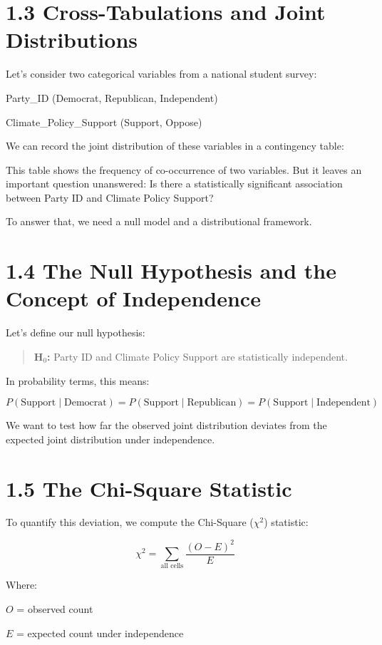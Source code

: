 \documentclass[12pt]{article}
\begin{document}
\section*{1.3 Cross-Tabulations and Joint Distributions}

Let’s consider two categorical variables from a national student survey:

Party\_ID (Democrat, Republican, Independent)

Climate\_Policy\_Support (Support, Oppose)

We can record the joint distribution of these variables in a contingency table:

This table shows the frequency of co-occurrence of two variables. But it leaves an important question unanswered: Is there a statistically significant association between Party ID and Climate Policy Support?

To answer that, we need a null model and a distributional framework.

\section*{1.4 The Null Hypothesis and the Concept of Independence}

Let’s define our null hypothesis:

\begin{quote}
\textbf{H$_0$:} Party ID and Climate Policy Support are statistically independent.
\end{quote}

In probability terms, this means:

\[
P(\text{Support} \mid \text{Democrat}) = P(\text{Support} \mid \text{Republican}) = P(\text{Support} \mid \text{Independent})
\]

We want to test how far the observed joint distribution deviates from the expected joint distribution under independence.

\section*{1.5 The Chi-Square Statistic}

To quantify this deviation, we compute the Chi-Square (\(\chi^2\)) statistic:

\[
\chi^2 = \sum_{\text{all cells}} \frac{(O - E)^2}{E}
\]

Where:

\(O\) = observed count

\(E\) = expected count under independence
\end{document}
